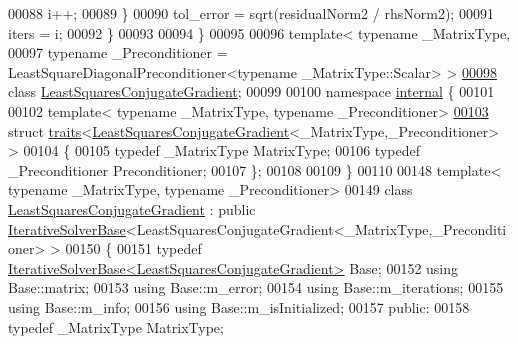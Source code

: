 \begin{DoxyCode}
00088     i++;
00089   \}
00090   tol\_error = sqrt(residualNorm2 / rhsNorm2);
00091   iters = i;
00092 \}
00093 
00094 \}
00095 
00096 \textcolor{keyword}{template}< \textcolor{keyword}{typename} \_MatrixType,
00097           \textcolor{keyword}{typename} \_Preconditioner = LeastSquareDiagonalPreconditioner<typename \_MatrixType::Scalar> >
\hyperlink{group___iterative_linear_solvers___module}{00098} \textcolor{keyword}{class }\hyperlink{group___iterative_linear_solvers___module_class_eigen_1_1_least_squares_conjugate_gradient}{LeastSquaresConjugateGradient};
00099 
00100 \textcolor{keyword}{namespace }\hyperlink{namespaceinternal}{internal} \{
00101 
00102 \textcolor{keyword}{template}< \textcolor{keyword}{typename} \_MatrixType, \textcolor{keyword}{typename} \_Preconditioner>
\hyperlink{struct_eigen_1_1internal_1_1traits_3_01_least_squares_conjugate_gradient_3_01___matrix_type_00_01___preconditioner_01_4_01_4}{00103} \textcolor{keyword}{struct }\hyperlink{struct_eigen_1_1internal_1_1traits}{traits}<\hyperlink{group___iterative_linear_solvers___module_class_eigen_1_1_least_squares_conjugate_gradient}{LeastSquaresConjugateGradient}<\_MatrixType,\_Preconditioner>
       >
00104 \{
00105   \textcolor{keyword}{typedef} \_MatrixType MatrixType;
00106   \textcolor{keyword}{typedef} \_Preconditioner Preconditioner;
00107 \};
00108 
00109 \}
00110 
00148 \textcolor{keyword}{template}< \textcolor{keyword}{typename} \_MatrixType, \textcolor{keyword}{typename} \_Preconditioner>
00149 \textcolor{keyword}{class }\hyperlink{group___iterative_linear_solvers___module_class_eigen_1_1_least_squares_conjugate_gradient}{LeastSquaresConjugateGradient} : \textcolor{keyword}{public} 
      \hyperlink{group___iterative_linear_solvers___module_class_eigen_1_1_iterative_solver_base}{IterativeSolverBase}<LeastSquaresConjugateGradient<\_MatrixType,\_Preconditioner> >
00150 \{
00151   \textcolor{keyword}{typedef} \hyperlink{group___iterative_linear_solvers___module_class_eigen_1_1_iterative_solver_base}{IterativeSolverBase<LeastSquaresConjugateGradient>}
       Base;
00152   \textcolor{keyword}{using} Base::matrix;
00153   \textcolor{keyword}{using} Base::m\_error;
00154   \textcolor{keyword}{using} Base::m\_iterations;
00155   \textcolor{keyword}{using} Base::m\_info;
00156   \textcolor{keyword}{using} Base::m\_isInitialized;
00157 \textcolor{keyword}{public}:
00158   \textcolor{keyword}{typedef} \_MatrixType MatrixType;

\end{DoxyCode}
